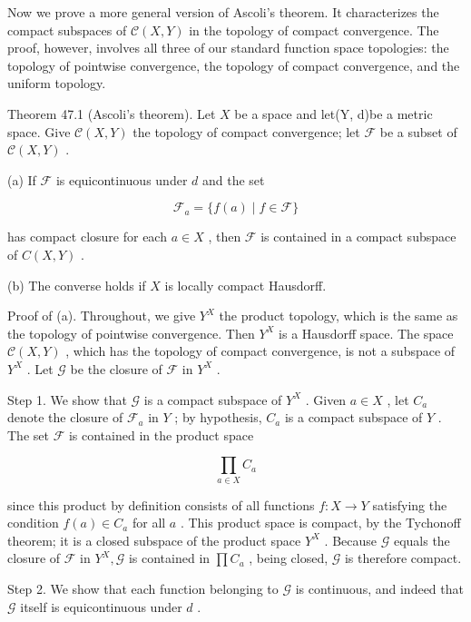 Now we prove a more general version of Ascoli's theorem. It characterizes the compact subspaces of \(\mathcal{C}\left( {X,Y}\right)\) in the topology of compact convergence. The proof, however, involves all three of our standard function space topologies: the topology of pointwise convergence, the topology of compact convergence, and the uniform topology.

Theorem 47.1 (Ascoli’s theorem). Let \(X\) be a space and let(Y, d)be a metric space. Give \(\mathcal{C}\left( {X,Y}\right)\) the topology of compact convergence; let \(\mathcal{F}\) be a subset of \(\mathcal{C}\left( {X,Y}\right)\) .

(a) If \(\mathcal{F}\) is equicontinuous under \(d\) and the set

\[
{\mathcal{F}}_{a} = \{ f\left( a\right)  \mid  f \in  \mathcal{F}\}
\]

has compact closure for each \(a \in  X\) , then \(\mathcal{F}\) is contained in a compact subspace of \(C\left( {X,Y}\right)\) .

(b) The converse holds if \(X\) is locally compact Hausdorff.

Proof of (a). Throughout, we give \({Y}^{X}\) the product topology, which is the same as the topology of pointwise convergence. Then \({Y}^{X}\) is a Hausdorff space. The space \(\mathcal{C}\left( {X,Y}\right)\) , which has the topology of compact convergence, is not a subspace of \({Y}^{X}\) . Let \(\mathcal{G}\) be the closure of \(\mathcal{F}\) in \({Y}^{X}\) .

Step 1. We show that \(\mathcal{G}\) is a compact subspace of \({Y}^{X}\) . Given \(a \in  X\) , let \({C}_{a}\) denote the closure of \({\mathcal{F}}_{a}\) in \(Y\) ; by hypothesis, \({C}_{a}\) is a compact subspace of \(Y\) . The set \(\mathcal{F}\) is contained in the product space

\[
\mathop{\prod }\limits_{{a \in  X}}{C}_{a}
\]

since this product by definition consists of all functions \(f : X \rightarrow  Y\) satisfying the condition \(f\left( a\right)  \in  {C}_{a}\) for all \(a\) . This product space is compact, by the Tychonoff theorem; it is a closed subspace of the product space \({Y}^{X}\) . Because \(\mathcal{G}\) equals the closure of \(\mathcal{F}\) in \({Y}^{X},\mathcal{G}\) is contained in \(\prod {C}_{a}\) , being closed, \(\mathcal{G}\) is therefore compact.

Step 2. We show that each function belonging to \(\mathcal{G}\) is continuous, and indeed that \(\mathcal{G}\) itself is equicontinuous under \(d\) .

